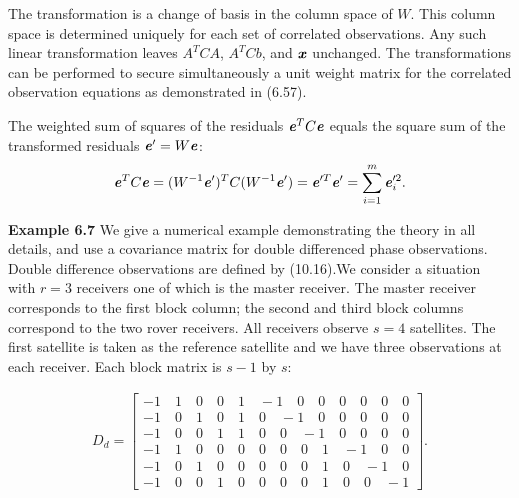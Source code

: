   The transformation is a change of basis in the column space of $W$. This column space is determined uniquely for each set of correlated observations. Any such linear transformation leaves $A^{T}CA$, $A^{T}Cb$, and $\textbf{\textit{x}}$ unchanged. The transformations can be performed to secure simultaneously a unit weight matrix for the correlated observation equations as demonstrated in (6.57).
  
  The weighted sum of squares of the residuals $\textbf{\textit{e}}^{T}C\textbf{\textit{e}}$ equals the square sum of the transformed residuals $\textbf{\textit{e}}'=W\textbf{\textit{e}}$:
  \begin{align*}
  \textbf{\textit{e}}^{T}C\textbf{\textit{e}} = 
  (W^{-1}\textbf{\textit{e}}')^{T}C(W^{-1}\textbf{\textit{e}}')=
  \textbf{\textit{e}}'^{T}\textbf{\textit{e}}' =
  \sum_{i=1}^m\textbf{\textit{e}}'^{2}_{i}.
  \end{align*}
\begin{flushleft}
	\textbf{Example 6.7} We give a numerical example demonstrating the theory in all details, and use a covariance matrix for double differenced phase observations. Double difference observations are defined by (10.16).We consider a situation with $r = 3$ receivers one of which is the master receiver. The master receiver corresponds to the first block column; the second and third block columns correspond to the two rover receivers. All receivers observe $s = 4$ satellites. The first satellite is taken as the reference satellite and we have three observations at each receiver. Each block matrix is $s-1$ by $s$:
\end{flushleft}
\begin{align*}
D_{d} =
\begin{bmatrix}
-1 \quad 1 \quad 0 \quad 0 \quad 1 \quad-1 \quad 0 \quad 0 \quad 0 \quad 0 \quad 0 \quad 0 \\
-1 \quad 0 \quad 1 \quad 0 \quad 1 \quad 0 \quad-1 \quad 0 \quad 0 \quad 0 \quad 0 \quad 0 \\
-1 \quad 0 \quad 0 \quad 1 \quad 1 \quad 0 \quad 0 \quad-1 \quad 0 \quad 0 \quad 0 \quad 0 \\
-1 \quad 1 \quad 0 \quad 0 \quad 0 \quad 0 \quad 0 \quad 0 \quad 1 \quad-1 \quad 0 \quad 0 \\
-1 \quad 0 \quad 1 \quad 0 \quad 0 \quad 0 \quad 0 \quad 0 \quad 1 \quad 0 \quad-1 \quad 0 \\
-1 \quad 0 \quad 0 \quad 1 \quad 0 \quad 0 \quad 0 \quad 0 \quad 1 \quad 0 \quad 0 \quad-1 
\end{bmatrix}.
\end{align*}

